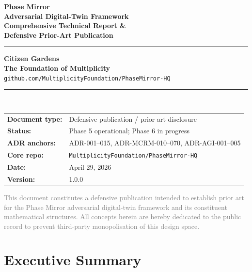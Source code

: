 \documentclass[12pt,a4paper]{article}
\theoremstyle{definition}
\theoremstyle{plain}
\theoremstyle{remark}
\begin{document}
\begin{titlepage}
\begin{center}
\vspace*{2cm}
{\Huge\bfseries\color{multBlue}Phase Mirror\\[0.4em]Adversarial Digital-Twin Framework}\\[1.2em]
{\large\color{multGold}\bfseries Comprehensive Technical Report \&\\Defensive Prior-Art Publication}\\[2.5em]
\hrule\vspace{0.6em}
{\normalsize\textbf{Citizen Gardens \\ The Foundation of Multiplicity}\\
\texttt{github.com/MultiplicityFoundation/PhaseMirror-HQ}}
\vspace{0.4em}\hrule\\[2em]
\begin{tabular}{ll}
\textbf{Document type:} & Defensive publication / prior-art disclosure \\
\textbf{Status:}        & Phase 5 operational; Phase 6 in progress \\
\textbf{ADR anchors:}   & ADR-001--015, ADR-MCRM-010--070, ADR-AGI-001--005 \\
\textbf{Core repo:}     & \texttt{MultiplicityFoundation/PhaseMirror-HQ} \\
\textbf{Date:}          & April 29, 2026 \\
\textbf{Version:}       & 1.0.0 \\
\end{tabular}
\vfill
\textcolor{gray}{\small
This document constitutes a defensive publication intended to establish prior art\\
for the Phase Mirror adversarial digital-twin framework and its constituent\\
mathematical structures. All concepts herein are hereby dedicated to the public\\
record to prevent third-party monopolisation of this design space.
}
\end{center}
\end{titlepage}

\setcounter{tocdepth}{3}
\tableofcontents
\newpage

\section{Executive Summary}
\label{sec:exec}
\end{document}

